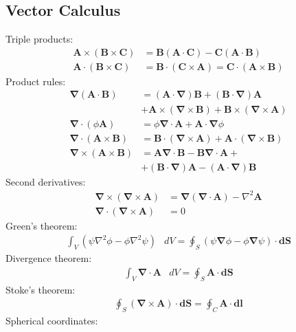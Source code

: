 \documentclass[10pt,twocolumn]{article}
\newcommand{\D}{\mathbf{\nabla}}
\newcommand{\A}{\mathbf{A}}
\newcommand{\B}{\mathbf{B}}
\newcommand{\C}{\mathbf{C}}
\newcommand{\dS}{\mathbf{dS}}
\newcommand{\dl}{\mathbf{dl}}
\newcommand{\laplacian}{\nabla^2}
\begin{document}
  \subsection*{Vector Calculus}
  Triple products:
  \begin{align*}
    \A\times(\B\times\C) &= \B(\A\cdot\C) - \C(\A\cdot\B) \\
    \A\cdot(\B\times\C) &= \B\cdot(\C\times\A) = \C\cdot(\A\times\B)
  \end{align*}
  Product rules:
  \begin{align*}
    \D(\A\cdot\B) &= (\A\cdot\D)\B+(\B\cdot\D)\A \\
    &+\A\times(\D\times\B)+\B\times(\D\times\A) \\
    \D\cdot(\phi\A) &= \phi\D\cdot\A + \A\cdot\D\phi \\
    \D\cdot(\A\times\B) &= \B\cdot(\D\times\A) + \A\cdot(\D\times\B) \\
    \D\times(\A\times\B) &= \A\D\cdot\B - \B\D\cdot\A + \\
    &+ (\B\cdot\D)\A - (\A\cdot\D)\B
  \end{align*}
  Second derivatives:
  \begin{align*}
    \D\times(\D\times\A) &= \D(\D\cdot\A) - \laplacian\A \\
    \D\cdot(\D\times\A) &=0
  \end{align*}
  Green's theorem:
  \begin{align*}
    \int_V\left(\psi\laplacian\phi-\phi\laplacian\psi\right)&dV
    = \oint_S\left(\psi\D\phi - \phi\D\psi\right)\cdot\dS
  \end{align*}
  Divergence theorem:
  \begin{align*}
    \int_V\D\cdot\mathbf{A}&dV = \oint_S\mathbf{A}\cdot\dS
  \end{align*}
  Stoke's theorem:
  \begin{align*}
    \oint_S(\D\times\mathbf{A})\cdot\dS = \oint_C\mathbf{A}\cdot\dl
  \end{align*}
  Spherical coordinates:
\end{document}
